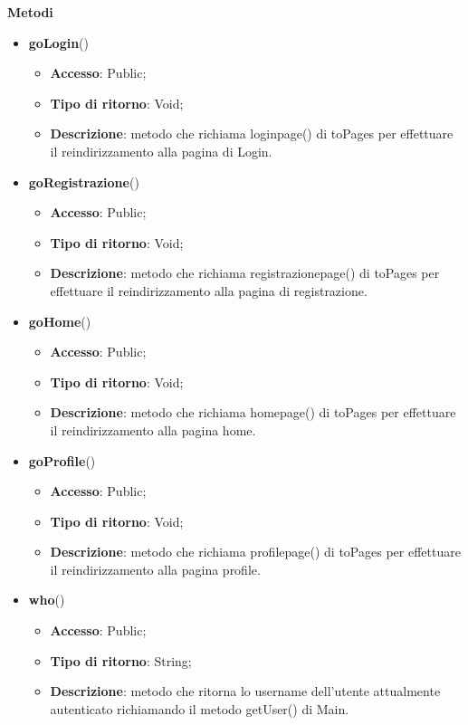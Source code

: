 {		\textbf{Metodi}
		\begin{itemize}
			\item \textbf{goLogin}()
			\begin{itemize}
				\item \textbf{Accesso}: Public;
				\item \textbf{Tipo di ritorno}: Void;
				\item \textbf{Descrizione}: metodo che richiama loginpage() di toPages per effettuare il reindirizzamento alla pagina di Login.
			\end{itemize}
			\item \textbf{goRegistrazione}()
			\begin{itemize}
				\item \textbf{Accesso}: Public;
				\item \textbf{Tipo di ritorno}: Void;
				\item \textbf{Descrizione}: metodo che richiama registrazionepage() di toPages per effettuare il reindirizzamento alla pagina di registrazione.
			\end{itemize}
			\item \textbf{goHome}()
			\begin{itemize}
				\item \textbf{Accesso}: Public;
				\item \textbf{Tipo di ritorno}: Void;
				\item \textbf{Descrizione}: metodo che richiama homepage() di toPages per effettuare il reindirizzamento alla pagina home.
			\end{itemize}
			\item \textbf{goProfile}()
			\begin{itemize}
				\item \textbf{Accesso}: Public;
				\item \textbf{Tipo di ritorno}: Void;
				\item \textbf{Descrizione}: metodo che richiama profilepage() di toPages per effettuare il reindirizzamento alla pagina profile.
			\end{itemize}
			\item \textbf{who}()
			\begin{itemize}
				\item \textbf{Accesso}: Public;
				\item \textbf{Tipo di ritorno}: String;
				\item \textbf{Descrizione}: metodo che ritorna lo username dell'utente attualmente autenticato richiamando il metodo getUser() di Main.

\end{itemize}
\end{itemize}}
